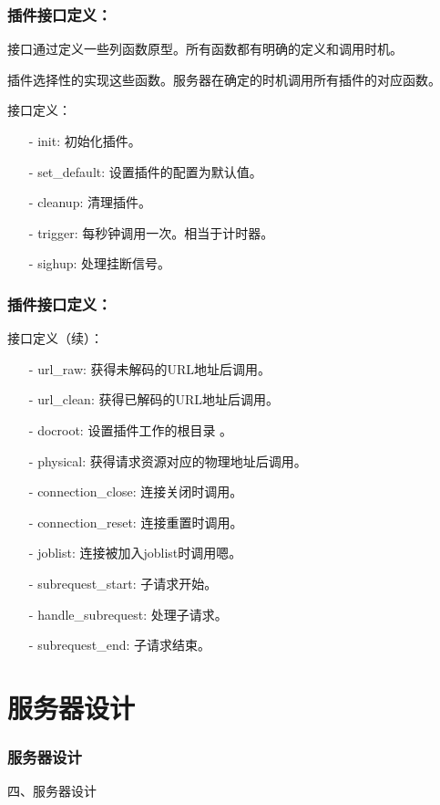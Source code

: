 \documentclass[10pt,dvipdfm]{beamer}
\begin{document}
\begin{frame}
	\frametitle{插件接口定义：}
	接口通过定义一些列函数原型。所有函数都有明确的定义和调用时机。
	
	插件选择性的实现这些函数。服务器在确定的时机调用所有插件的对应函数。
	
	\pause
	
	\begin{block}{接口定义：}
	\begin{itemize}
		\item[-] init: 初始化插件。
		\item[-] set\_default: 设置插件的配置为默认值。
		\item[-] cleanup: 清理插件。
		\item[-] trigger: 每秒钟调用一次。相当于计时器。
		\item[-] sighup: 处理挂断信号。
	\end{itemize}
	\end{block}
\end{frame}

\begin{frame}
	\frametitle{插件接口定义：}
	\begin{block}{接口定义（续）：}
	\begin{itemize}
		\item[-] url\_raw: 获得未解码的URL地址后调用。
		\item[-] url\_clean: 获得已解码的URL地址后调用。
		\item[-] docroot: 设置插件工作的根目录 。
		\item[-] physical: 获得请求资源对应的物理地址后调用。
		\item[-] connection\_close: 连接关闭时调用。
		\item[-] connection\_reset: 连接重置时调用。
		\item[-] joblist: 连接被加入joblist时调用嗯。
		\item[-] subrequest\_start: 子请求开始。
		\item[-] handle\_subrequest: 处理子请求。
		\item[-] subrequest\_end: 子请求结束。
	\end{itemize}
	\end{block}
\end{frame}

\section{服务器设计}

\begin{frame}
	\frametitle{服务器设计}
	\begin{center}
	{\Large
		四、服务器设计
	}
	\end{center}
\end{frame}
\end{document}
